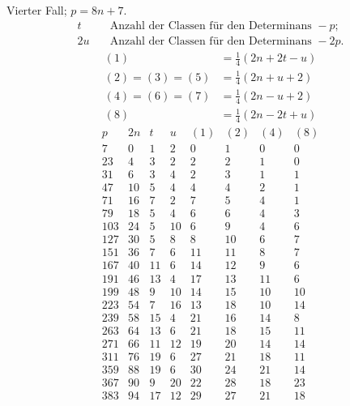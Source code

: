 Vierter Fall; $p=8n+7$.
\[
\begin{aligned}
t&\quad\text{Anzahl der Classen für den Determinans }-p;\\
2u&\quad\text{Anzahl der Classen für den Determinans }-2p.
\end{aligned}
\]
\[
\begin{aligned}
(1)&=\tfrac14(2n+2t-u)\\
(2)=(3)=(5)&=\tfrac14(2n+u+2)\\
(4)=(6)=(7)&=\tfrac14(2n-u+2)\\
(8)&=\tfrac14(2n-2t+u)
\end{aligned}
\]
\[
\begin{array}{r|r|r|r|r|r|r|r}
p&2n&t&u&(1)&(2)&(4)&(8)\\\hline
7&0&1&2&0&1&0&0\\
23&4&3&2&2&2&1&0\\
31&6&3&4&2&3&1&1\\
47&10&5&4&4&4&2&1\\
71&16&7&2&7&5&4&1\\
79&18&5&4&6&6&4&3\\
103&24&5&10&6&9&4&6\\
127&30&5&8&8&10&6&7\\
151&36&7&6&11&11&8&7\\
167&40&11&6&14&12&9&6\\
191&46&13&4&17&13&11&6\\
199&48&9&10&14&15&10&10\\
223&54&7&16&13&18&10&14\\
239&58&15&4&21&16&14&8\\
263&64&13&6&21&18&15&11\\
271&66&11&12&19&20&14&14\\
311&76&19&6&27&21&18&11\\
359&88&19&6&30&24&21&14\\
367&90&9&20&22&28&18&23\\
383&94&17&12&29&27&21&18
\end{array}
\]
